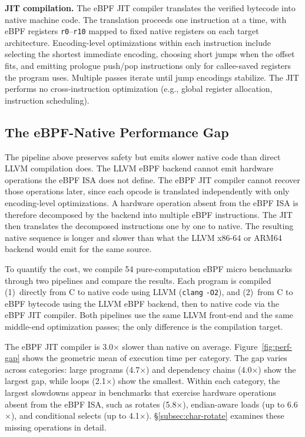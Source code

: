 \noindent\textbf{JIT compilation.}
The eBPF JIT compiler translates the verified bytecode into native machine code. The translation proceeds one instruction at a time, with eBPF registers \texttt{r0}--\texttt{r10} mapped to fixed native registers on each target architecture. Encoding-level optimizations within each instruction include selecting the shortest immediate encoding, choosing short jumps when the offset fits, and emitting prologue push/pop instructions only for callee-saved registers the program uses. Multiple passes iterate until jump encodings stabilize. The JIT performs no cross-instruction optimization (e.g., global register allocation, instruction scheduling).

\subsection{The eBPF-Native Performance Gap}
\label{subsec:gap}

The pipeline above preserves safety but emits slower native code than direct LLVM compilation does. The LLVM eBPF backend cannot emit hardware operations the eBPF ISA does not define. The eBPF JIT compiler cannot recover those operations later, since each opcode is translated independently with only encoding-level optimizations. A hardware operation absent from the eBPF ISA is therefore decomposed by the backend into multiple eBPF instructions. The JIT then translates the decomposed instructions one by one to native. The resulting native sequence is longer and slower than what the LLVM x86-64 or ARM64 backend would emit for the same source.

To quantify the cost, we compile 54 pure-computation eBPF micro benchmarks through two pipelines and compare the results. Each program is compiled (1)~directly from C to native code using LLVM (\texttt{clang} \texttt{-O2}), and (2)~from C to eBPF bytecode using the LLVM eBPF backend, then to native code via the eBPF JIT compiler. Both pipelines use the same LLVM front-end and the same middle-end optimization passes; the only difference is the compilation target.

The eBPF JIT compiler is 3.0$\times$ slower than native on average. Figure~\ref{fig:perf-gap} shows the geometric mean of execution time per category. The gap varies across categories: large programs (4.7$\times$) and dependency chains (4.0$\times$) show the largest gap, while loops (2.1$\times$) show the smallest. Within each category, the largest slowdowns appear in benchmarks that exercise hardware operations absent from the eBPF ISA, such as rotates (5.8$\times$), endian-aware loads (up to 6.6$\times$), and conditional selects (up to 4.1$\times$). \S\ref{subsec:char-rotate} examines these missing operations in detail.

